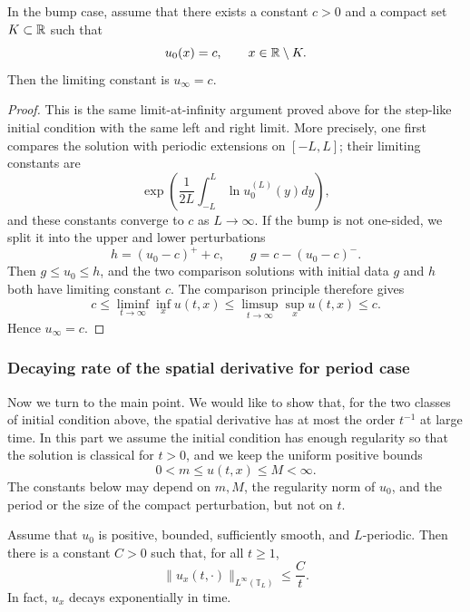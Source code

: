 \begin{theorem}
    In the bump case, assume that there exists a constant $c>0$ and a compact set $K\subset \mathbb{R}$ such that
    \[
        u_0(x)=c,\qquad x\in \mathbb{R}\setminus K .
    \]
    Then the limiting constant is $u_{\infty}=c$.
\end{theorem}
\begin{proof}
    This is the same limit-at-infinity argument proved above for the step-like initial condition with the same left and right limit. More precisely, one first compares the solution with periodic extensions on $[-L,L]$; their limiting constants are
    \[
        \exp\left(\dfrac1{2L}\int_{-L}^{L}\ln u_0^{(L)}(y)dy\right),
    \]
    and these constants converge to $c$ as $L\to\infty$. If the bump is not one-sided, we split it into the upper and lower perturbations
    \[
        h=(u_0-c)^+ +c,
        \qquad
        g=c-(u_0-c)^- .
    \]
    Then $g\leq u_0\leq h$, and the two comparison solutions with initial data $g$ and $h$ both have limiting constant $c$. The comparison principle therefore gives
    \[
        c\leq \liminf_{t\to\infty}\inf_x u(t,x)
        \leq \limsup_{t\to\infty}\sup_x u(t,x)
        \leq c.
    \]
    Hence $u_{\infty}=c$.
\end{proof}

\subsubsection{Decaying rate of the spatial derivative for period case}

Now we turn to the main point. We would like to show that, for the two classes of initial condition above, the spatial derivative has at most the order $t^{-1}$ at large time. In this part we assume the initial condition has enough regularity so that the solution is classical for $t>0$, and we keep the uniform positive bounds
\begin{equation}\label{eq:decay-positive-bound}
    0<m\leq u(t,x)\leq M<\infty .
\end{equation}
The constants below may depend on $m,M$, the regularity norm of $u_0$, and the period or the size of the compact perturbation, but not on $t$.

\begin{theorem}\label{thm:periodic-ux-decay}
    Assume that $u_0$ is positive, bounded, sufficiently smooth, and $L$-periodic. Then there is a constant $C>0$ such that, for all $t\geq 1$,
    \[
        \lVert u_x(t,\cdot)\rVert_{L^{\infty}(\mathbb T_L)}\leq \dfrac{C}{t}.
    \]
    In fact, $u_x$ decays exponentially in time.
\end{theorem}

